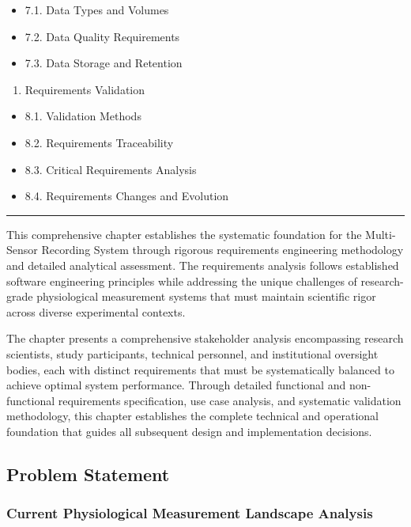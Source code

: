 \documentclass[12pt,a4paper]{report}
\begin{document}
\begin{itemize}
\item 7.1. Data Types and Volumes
\item 7.2. Data Quality Requirements
\item 7.3. Data Storage and Retention
\end{itemize}
\begin{enumerate}
\item Requirements Validation
\end{enumerate}
\begin{itemize}
\item 8.1. Validation Methods
\item 8.2. Requirements Traceability
\item 8.3. Critical Requirements Analysis
\item 8.4. Requirements Changes and Evolution

\end{itemize}
\hrule

This comprehensive chapter establishes the systematic foundation for the Multi-Sensor Recording System through rigorous
requirements engineering methodology and detailed analytical assessment. The requirements analysis follows established
software engineering principles while addressing the unique challenges of research-grade physiological measurement
systems that must maintain scientific rigor across diverse experimental contexts.

The chapter presents a comprehensive stakeholder analysis encompassing research scientists, study participants,
technical personnel, and institutional oversight bodies, each with distinct requirements that must be systematically
balanced to achieve optimal system performance. Through detailed functional and non-functional requirements
specification, use case analysis, and systematic validation methodology, this chapter establishes the complete technical
and operational foundation that guides all subsequent design and implementation decisions.

\subsection{Problem Statement}

\subsubsection{Current Physiological Measurement Landscape Analysis}
\end{document}
